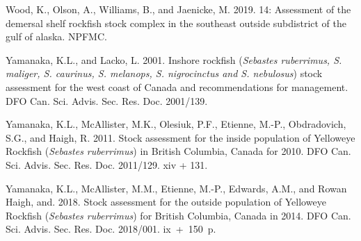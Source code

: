 \documentclass[11pt]{book}
\begin{document}
\begin{CSLReferences}{1}{0}
%
Wood, K., Olson, A., Williams, B., and Jaenicke, M. 2019. 14: Assessment of the demersal shelf rockfish stock complex in the southeast outside subdistrict of the gulf of alaska. {NPFMC}.

%
Yamanaka, K.L., and Lacko, L. 2001. Inshore rockfish ({\emph{Sebastes ruberrimus, S. maliger, S. caurinus, S. melanops, S. nigrocinctus and S. nebulosus}}) stock assessment for the west coast of {Canada} and recommendations for management. DFO Can. Sci. Advis. Sec. Res. Doc. 2001/139.

%
Yamanaka, K.L., McAllister, M.K., Olesiuk, P.F., Etienne, M.-P., Obdradovich, S.G., and Haigh, R. 2011. Stock assessment for the inside population of {Yelloweye} {Rockfish} {(\emph{Sebastes ruberrimus})} in {British Columbia}, {Canada} for 2010. DFO Can. Sci. Advis. Sec. Res. Doc. 2011/129. xiv + 131.

%
Yamanaka, K.L., McAllister, M.M., Etienne, M.-P., Edwards, A.M., and Rowan Haigh, and. 2018. Stock assessment for the outside population of {Yelloweye Rockfish} ({\emph{Sebastes ruberrimus}}) for {British Columbia, Canada} in 2014. DFO Can. Sci. Advis. Sec. Res. Doc. 2018/001. ix~+~150~p.

\end{CSLReferences}
\end{document}
